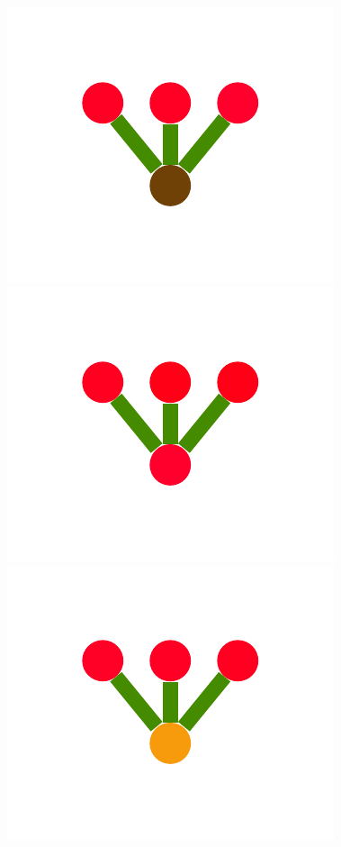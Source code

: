 \documentclass[a4paper,10pt]{article}
\begin{document}
\begin{figure}
{    \includegraphics[scale=.26]{../figures/vector/4-2-1-noisyprog-postA-0.pdf}
    \includegraphics[scale=.26]{../figures/vector/4-2-1-noisyprog-postA-1.pdf}
    \includegraphics[scale=.26]{../figures/vector/4-2-1-noisyprog-postA-2.pdf}
}
\end{figure}
\end{document}
